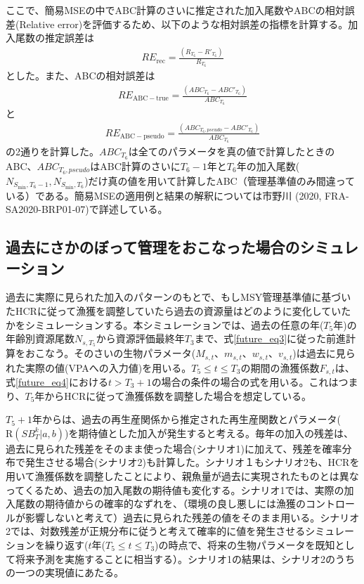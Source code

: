 \documentclass[11pt]{jsarticle}
\begin{document}
ここで、簡易MSEの中でABC計算のさいに推定された加入尾数やABCの相対誤差(Relative error)を評価するため、以下のような相対誤差の指標を計算する。加入尾数の推定誤差は
\begin{eqnarray}
  R\!E_{\mathrm{rec}} = \frac{(R_{T_6}-R'_{T_6})}{R_{T_6}}
\label{RE1}
\end{eqnarray}
とした。また、ABCの相対誤差は
\begin{eqnarray}
  R\!E_{\mathrm{ABC-true}} = \frac{(ABC_{T_6}-ABC'_{T_6})}{ABC_{T_6}}
\end{eqnarray}
と
\begin{eqnarray}
  R\!E_{\mathrm{ABC-pseudo}} = \frac{(ABC_{T_6, pseudo}-ABC'_{T_6})}{ABC_{T_6}}
\end{eqnarray}
の2通りを計算した。$ABC_{T_6}$は全てのパラメータを真の値で計算したときのABC、$ABC_{T_6, pseudo}$はABC計算のさいに$T_6-1$年と$T_6$年の加入尾数($N_{S_{\mathrm{min}},T_6 -1}, N_{S_{\mathrm{min}},T_6}$)だけ真の値を用いて計算したABC（管理基準値のみ間違っている）である。簡易MSEの適用例と結果の解釈については市野川 (2020, FRA-SA2020-BRP01-07)で詳述している。

\subsection{過去にさかのぼって管理をおこなった場合のシミュレーション\label{sec:whatif}}

過去に実際に見られた加入のパターンのもとで、もしMSY管理基準値に基づいたHCRに従って漁獲を調整していたら過去の資源量はどのように変化していたかをシミュレーションする。本シミュレーションでは、過去の任意の年($T_5$年)の年齢別資源尾数$N_{s,T_5}$から資源評価最終年$T_3$まで、式\ref{future_eq3}に従った前進計算をおこなう。そのさいの生物パラメータ($M_{s,t}$、$m_{s,t}$、$w_{s,t}$、$v_{s,t}$)は過去に見られた実際の値(VPAへの入力値)を用いる。$T_5 \leq t \leq T_3$の期間の漁獲係数$F_{s,t}$は、式\ref{future_eq4}における$t > T_3+1$の場合の条件の場合の式を用いる。これはつまり、$T_5$年からHCRに従って漁獲係数を調整した場合を想定している。

$T_5+1$年からは、過去の再生産関係から推定された再生産関数とパラメータ($\mathrm{R}(S\!B_{T}^k|a,b)$)を期待値とした加入が発生すると考える。毎年の加入の残差は、過去に見られた残差をそのまま使った場合(シナリオ1)に加えて、残差を確率分布で発生させる場合(シナリオ2)も計算した。シナリオ１もシナリオ2も、HCRを用いて漁獲係数を調整したことにより、親魚量が過去に実現されたものとは異なってくるため、過去の加入尾数の期待値も変化する。シナリオ1では、実際の加入尾数の期待値からの確率的なずれを、（環境の良し悪しには漁獲のコントロールが影響しないと考えて）過去に見られた残差の値をそのまま用いる。シナリオ2では、対数残差が正規分布に従うと考えて確率的に値を発生させるシミュレーションを繰り返す($t$年($T_5 \leq t \leq T_3$)の時点で、将来の生物パラメータを既知として将来予測を実施することに相当する）。シナリオ1の結果は、シナリオ2のうちの一つの実現値にあたる。
\end{document}
